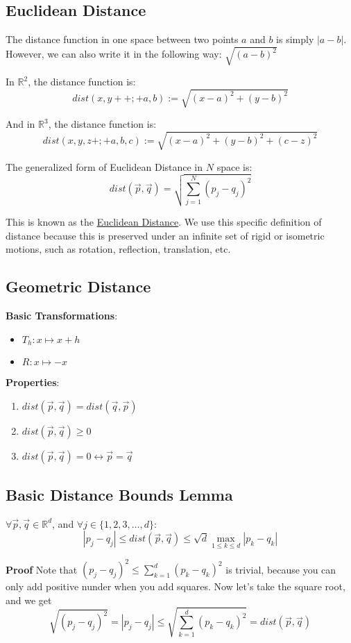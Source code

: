 \documentclass[11 pt, twoside]{article}
\begin{document}
\subsection{Euclidean Distance}
The distance function in one space between two points $a$ and $b$ is simply $|a
- b|$. However, we can also write it in the following way: $\sqrt{(a - b)^2}$

In $\mathbb{R}^2$, the distance function is:
$$dist(x, y++;+a,b) := \sqrt{(x - a)^2 + (y - b)^2}$$

And in $\mathbb{R}^3$, the distance function is:
$$dist(x, y, z+;+ a,b,c) := \sqrt{(x - a)^2 + (y - b)^2 + (c - z)^2}$$

The generalized form of Euclidean Distance in $N$ space is:
$$dist(\vec{p}, \vec{q}) = \sqrt{\sum_{j = 1}^N (p_j - q_j)^2}$$

This is known as the \underline{Euclidean Distance}. We use this specific
definition of distance because this is preserved under an infinite set of rigid
or isometric motions, such as rotation, reflection, translation, etc.

\subsection{Geometric Distance}

\textbf{Basic Transformations}:
\begin{itemize}
\item $T_h : x \mapsto x+h$
\item $R: x \mapsto -x$
\end{itemize}

\textbf{Properties}:
\begin{enumerate}
\item $dist(\vec{p}, \vec{q}) = dist(\vec{q}, \vec{p})$
\item $dist(\vec{p}, \vec{q}) \geq 0$
\item $dist(\vec{p}, \vec{q}) = 0 \leftrightarrow \vec{p} = \vec{q}$
\end{enumerate}

\subsection{Basic Distance Bounds Lemma}
$\forall \vec{p}, \vec{q} \in
\mathbb{R}^d$, and $\forall j \in \{1,2,3,\dots,d\}$:
$$|p_j - q_j| \leq dist(\vec{p}, \vec{q}) \leq \sqrt{d} \max_{1 \leq k \leq
d} |p_k - q_k|$$

\textbf{Proof}
Note that $(p_j - q_j)^2 \leq \sum_{k = 1}^d (p_k - q_k)^2$ is trivial, because
you can only add positive nunder when you add squares. Now let's take the square
root, and we get
$$\sqrt{(p_j - q_j)^2} = |p_j - q_j| \leq \sqrt{\sum_{k = 1}^d (p_k - q_k)^2} =
dist(\vec{p}, \vec{q})$$
\end{document}
